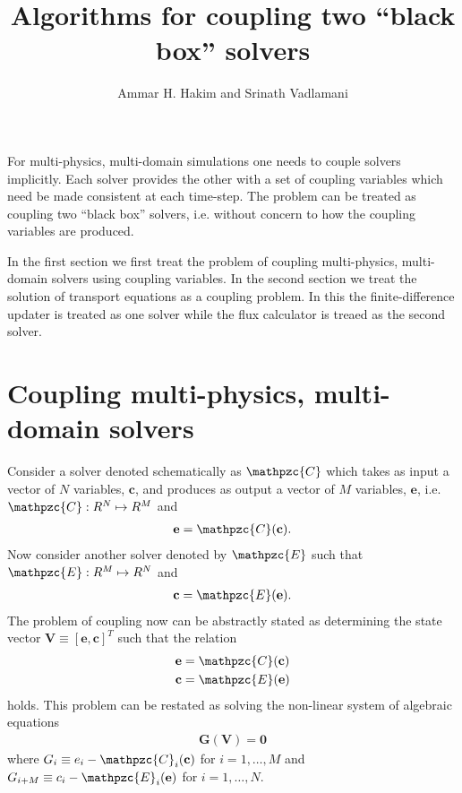 \documentclass[11pt]{article}
\title{Algorithms for coupling two ``black box'' solvers}
\author{Ammar H. Hakim and Srinath Vadlamani}
\date{}
\newcommand{\mvec}[1]{\mathbf{#1}}
\newcommand{\script}[1]{\mathpzc{#1}}
\begin{document}
\maketitle

For multi-physics, multi-domain simulations one needs to couple
solvers implicitly. Each solver provides the other with a set of
coupling variables which need be made consistent at each
time-step. The problem can be treated as coupling two ``black box''
solvers, i.e. without concern to how the coupling variables are
produced.

In the first section we first treat the problem of coupling
multi-physics, multi-domain solvers using coupling variables. In the
second section we treat the solution of transport equations as a
coupling problem. In this the finite-difference updater is treated as
one solver while the flux calculator is treaed as the second solver.

\section{Coupling multi-physics, multi-domain solvers}

Consider a solver denoted schematically as $\script{C}$ which takes as
input a vector of $N$ variables, $\mvec{c}$, and produces as output a
vector of $M$ variables, $\mvec{e}$, i.e. $\script{C} : R^{N} \mapsto
R^{M}$ and
\begin{align}
  \mvec{e} = \script{C}(\mvec{c}).
\end{align}
Now consider another solver denoted by $\script{E}$ such that
$\script{E} : R^{M} \mapsto R^{N}$ and
\begin{align}
  \mvec{c} = \script{E}(\mvec{e}).
\end{align}
The problem of coupling now can be abstractly stated as determining
the state vector $\mvec{V} \equiv [\mvec{e}, \mvec{c}]^T$ such that
the relation
\begin{align}
  \mvec{e} &= \script{C}(\mvec{c}) \\
  \mvec{c} &= \script{E}(\mvec{e})
\end{align}
holds. This problem can be restated as solving the non-linear system
of algebraic equations 
\begin{align}
  \mvec{G}(\mvec{V}) = \mvec{0}
\end{align}
where $G_i \equiv e_i - \script{C}_i(\mvec{c})$ for $i=1,\ldots,M$ and
$G_{i+M} \equiv c_i - \script{E}_i(\mvec{e})$ for $i=1,\ldots,N$.
\end{document}
